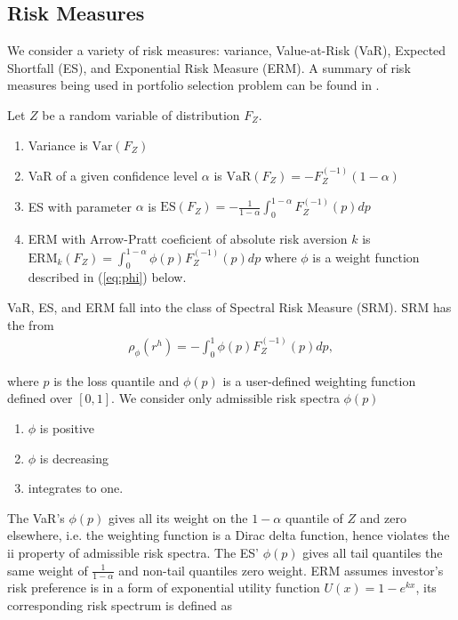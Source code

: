 \subsection{Risk Measures}\label{subsec:spectral-risk-measures}
We consider a variety of risk measures: variance, Value-at-Risk (VaR), Expected Shortfall (ES), and Exponential Risk Measure (ERM).
A summary of risk measures being used in portfolio selection problem can be found in \citet{hardle2008applied}.\medskip
\medskip


Let $Z$ be a random variable of distribution $F_Z$.
\begin{enumerate}
	\item Variance is $\text{Var}(F_Z)$
	\item VaR of a given confidence level $\alpha$ is $\text{VaR}(F_Z) = -F_{Z}^{(-1)}(1-\alpha)$
	\item ES with parameter $\alpha$ is $\text{ES}(F_Z) = -\frac{1}{1-\alpha}\int_0^{1-\alpha}F_Z^{(-1)}(p)dp$
	\item ERM with Arrow-Pratt coeficient of absolute risk aversion $k$ is $\text{ERM}_k(F_Z) = \int_0^{1-\alpha}\phi(p) F_Z^{(-1)}(p)dp$ where $\phi$ is a weight function described in (\ref{eq:phi}) below.
	\end{enumerate}\medskip

VaR, ES, and ERM fall into the class of Spectral Risk Measure (SRM).
SRM has the from \citep{Acerbi2002}%
\begin{align}
	\rho_\phi(r^h) = - \int_0^1 \phi(p) F_{Z}^{(-1)}(p)d p,
	\end{align}

where $p$ is the loss quantile and $\phi(p)$ is a user-defined weighting function defined over $[0,1]$. \medskip
We consider only admissible risk spectra $\phi(p)$ %
\begin{enumerate}[label=\roman*]
	\item $\phi$ is positive
	\item $\phi$ is decreasing
	\item integrates to one.
	\end{enumerate}\medskip

The VaR's $\phi(p)$ gives all its weight on the $1-\alpha$ quantile of $Z$ and zero elsewhere,
i.e. the weighting function is a Dirac delta function, hence violates the ii property of admissible risk spectra.
The ES' $\phi(p)$ gives all tail quantiles the same weight of $\frac{1}{1-\alpha}$ and non-tail quantiles zero weight.
ERM assumes investor's risk preference is in a form of exponential utility function $U(x)=1-e^{kx}$,
its corresponding risk spectrum is defined as

